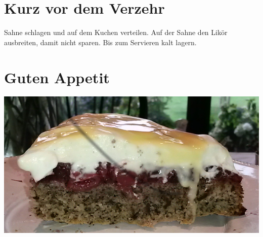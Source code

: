\documentclass[10pt]{proc}
\begin{document}
\section{Kurz vor dem Verzehr}
Sahne schlagen und auf dem Kuchen verteilen. Auf der Sahne den Likör ausbreiten, damit nicht sparen. Bis zum Servieren kalt lagern.

\section{Guten Appetit}
\includegraphics[scale=0.4]{pic}
\end{document}
